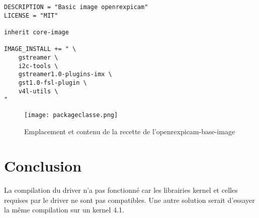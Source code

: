 \begin{lstlisting}
DESCRIPTION = "Basic image openrexpicam"
LICENSE = "MIT"

inherit core-image

IMAGE_INSTALL += " \
    gstreamer \
    i2c-tools \
    gstreamer1.0-plugins-imx \
    gst1.0-fsl-plugin \
    v4l-utils \
"
\end{lstlisting}

\begin{figure}[th]
    \centering
    \texttt{[image: packageclasse.png]}
    \decoRule
    \caption{Emplacement et contenu de la recette de l'openrexpicam-base-image}
    \label{fig:arbor}
\end{figure}

\section{Conclusion}

La compilation du driver n’a pas fonctionné car les librairies kernel et celles
requises par le driver ne sont pas compatibles. Une autre solution serait d’essayer
la même compilation sur un kernel 4.1.